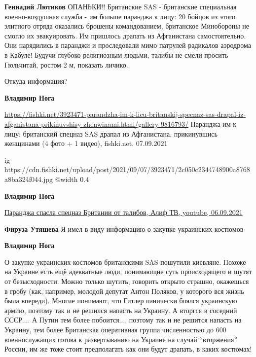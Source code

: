 \begin{itemize}
\begin{itemize}
\textbf{Геннадий Лютиков} ОПАНЬКИ!! Британские SAS - британские специальная военно-воздушная служба - им больше паранджа к лицу: 20 бойцов из этого элитного отряда оказались брошены командованием, британское Минобороны не смогло их эвакуировать. Им пришлось драпать из Афганистана самостоятельно. Они нарядились в паранджи и проследовали мимо патрулей радикалов аэродрома в Кабуле! Будучи глубоко религиозным людьми, талибы не смели просить Гюльчитай, ростом 2 м, показать личико.

Откуда информация?

\textbf{Владимир Нога}

\url{https://fishki.net/3923471-parandzha-im-k-licu-britanskij-specnaz-sas-drapal-iz-afganistana-prikinuvshisy-zhenwinami.html/gallery-9816793/}{%
Паранджа им к лицу: британский спецназ SAS драпал из Афганистана, прикинувшись женщинами (4 фото + 1 видео), %
fishki.net, 07.09.2021%
}

\ifcmt
  ig https://cdn.fishki.net/upload/post/2021/09/07/3923471/2c050c2344748900a8768a8ba324f044.jpg
  @width 0.4
\fi

\textbf{Владимир Нога}

\href{https://youtu.be/HCqKMhvEMto}{%
Паранджа спасла спецназ Британии от талибов, Алиф ТВ, youtube, 06.09.2021%
}

\textbf{Фируза Утяшева} Я имел в виду информацию о закупке украинских костюмов

\textbf{Владимир Нога} 

О закупке украинских костюмов британскими SAS пошутили киевляне. Похоже на
Украине есть ещё адекватные люди, понимающие суть происходящего и шутят от
безысходности. Можно только шутить, говорить открыто страшно, окажешься в гробу
(как, например, молодой депутат Антон Поляков, у которого вся жизнь была
впереди). Многие понимают, что Гитлер панически боялся украинскую армию,
поэтому так и не решился напасть на Украину. А вторгся в соседний СССР.... А
Путин тем более побоится..., поэтому так и не решится напасть на Украину, тем
более Британская оперативная группа численностью до 600 военнослужащих готова к
развертыванию на Украине на случай \enquote{вторжения} России, им же тоже стоит
предполагать как они будут драпать, в каких костюмах!

\end{itemize} %

\end{itemize} %
